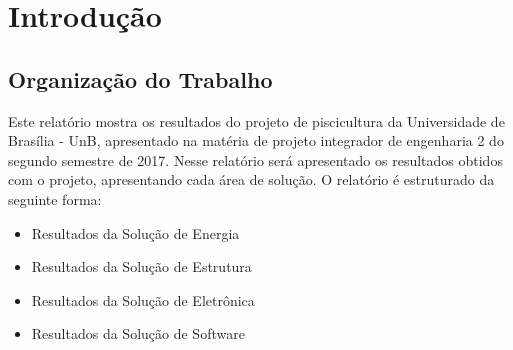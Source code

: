 \chapter[Introdução]{Introdução}\label{cap1}

\section{Organização do Trabalho}

Este relatório mostra os resultados do projeto de piscicultura da Universidade de Brasília - UnB, apresentado na matéria
de projeto integrador de engenharia 2 do segundo semestre de 2017. Nesse relatório será apresentado
os resultados obtidos com o projeto, apresentando cada área de solução. O relatório é estruturado da seguinte forma:
 
\begin{itemize}
  \item Resultados da Solução de Energia
  \item Resultados da Solução de Estrutura
  \item Resultados da Solução de Eletrônica
  \item Resultados da Solução de Software
\end{itemize}
